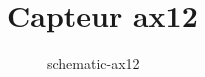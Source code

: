 
\chapter{Capteur ax12}
\label{sec:schematic-ax12}

\begin{figure}[htpb]
  \centering
  \caption{schematic-ax12}
  \label{fig:schematic-ax12}
\end{figure}
